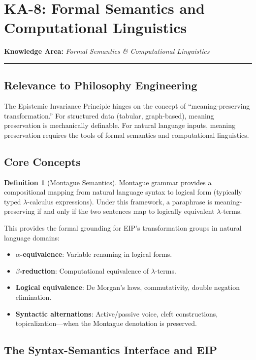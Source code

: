 \documentclass[12pt,letterpaper]{article}
\theoremstyle{definition}
\newtheorem{definition}[theorem]{Definition}
\theoremstyle{plain}
\newcommand{\ka}[1]{\vspace{1em}\noindent\textbf{\large Knowledge Area:} \textit{#1}\vspace{0.5em}\hrule\vspace{0.5em}}
\begin{document}
\section{KA-8: Formal Semantics and Computational Linguistics}
\label{sec:ka8}

\ka{Formal Semantics \& Computational Linguistics}

\subsection{Relevance to Philosophy Engineering}

The Epistemic Invariance Principle hinges on the concept of ``meaning-preserving transformation.'' For structured data (tabular, graph-based), meaning preservation is mechanically definable. For natural language inputs, meaning preservation requires the tools of formal semantics and computational linguistics.

\subsection{Core Concepts}

\begin{definition}[Montague Semantics]
Montague grammar provides a compositional mapping from natural language syntax to logical form (typically typed $\lambda$-calculus expressions). Under this framework, a paraphrase is meaning-preserving if and only if the two sentences map to logically equivalent $\lambda$-terms.
\end{definition}

This provides the formal grounding for EIP's transformation groups in natural language domains:
\begin{itemize}
    \item \textbf{$\alpha$-equivalence}: Variable renaming in logical forms.
    \item \textbf{$\beta$-reduction}: Computational equivalence of $\lambda$-terms.
    \item \textbf{Logical equivalence}: De Morgan's laws, commutativity, double negation elimination.
    \item \textbf{Syntactic alternations}: Active/passive voice, cleft constructions, topicalization---when the Montague denotation is preserved.
\end{itemize}

\subsection{The Syntax-Semantics Interface and EIP}
\end{document}
